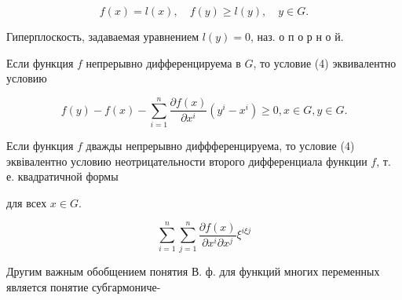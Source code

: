 \documentclass[10pt]{article}
\begin{document}
\[

f(x)=l(x), \quad f(y) \geqslant l(y), \quad y \in G .

\]



Гиперплоскость, задаваемая уравнением $l(y)=0$, наз. о п о р н о й.



Если функция $f$ непрерывно дифференцируема в $G$, то условие (4) эквивалентно условию



\[

f(y)-f(x)-\sum_{i=1}^{n} \frac{\partial f(x)}{\partial x^{i}}\left(y^{i}-x^{i}\right) \geqslant 0, x \in G, y \in G .

\]



Если функция $f$ дважды непрерывно диффференцируема, то условие (4) эквівалентно условию неотрицательности второго дифференциала функции $f$, т. е. квадратичной формы



для всех $x \in G$.



\[

\sum_{i=1}^{n} \sum_{j=1}^{n} \frac{\partial f(x)}{\partial x^{i} \partial x^{j}} \xi^{i \xi j}

\]



Другим важным обобщением понятия В. ф. для функций многих переменных является понятие субгармониче-
\end{document}

